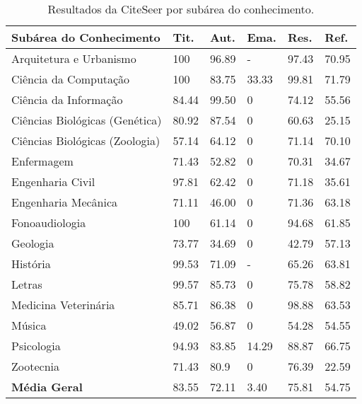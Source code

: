 \begin{table}
    \caption{Resultados da CiteSeer por subárea do conhecimento.}
    \begin{center}
        \begin{tabular}{|p{6cm}|C{1.2cm}|C{1.2cm}|C{1.2cm}|C{1.2cm}|C{1.2cm}|}
            \hline 
            \textbf{Subárea do Conhecimento} & \textbf{Tit.} & \textbf{Aut.} & \textbf{Ema.} & \textbf{Res.} & \textbf{Ref.} \\ \hline 
            Arquitetura e Urbanismo & 100 & 96.89 & - & 97.43 & 70.95 \\ \hline
            Ciência da Computação & 100 & 83.75 & 33.33 & 99.81 & 71.79 \\ \hline
            Ciência da Informação & 84.44 & 99.50 & 0 & 74.12 & 55.56 \\ \hline
            Ciências Biológicas (Genética) & 80.92 & 87.54 & 0 & 60.63 & 25.15 \\ \hline
            Ciências Biológicas (Zoologia) & 57.14 & 64.12 & 0 & 71.14 & 70.10 \\ \hline
            Enfermagem & 71.43 & 52.82 & 0 & 70.31 & 34.67 \\ \hline
            Engenharia Civil & 97.81 & 62.42 & 0 & 71.18 & 35.61 \\ \hline
            Engenharia Mecânica & 71.11 & 46.00 & 0 & 71.36 & 63.18 \\ \hline
            Fonoaudiologia & 100 & 61.14 & 0 & 94.68 & 61.85 \\ \hline
            Geologia & 73.77 & 34.69 & 0 & 42.79 & 57.13 \\ \hline
            História & 99.53 & 71.09 & - & 65.26 & 63.81 \\ \hline
            Letras & 99.57 & 85.73 & 0 & 75.78 & 58.82 \\ \hline
            Medicina Veterinária & 85.71 & 86.38 & 0 & 98.88 & 63.53 \\ \hline
            Música & 49.02 & 56.87 & 0 & 54.28 & 54.55 \\ \hline
            Psicologia & 94.93 & 83.85 & 14.29 & 88.87 & 66.75 \\ \hline
            Zootecnia & 71.43 & 80.9 & 0 & 76.39 & 22.59 \\ \hline
            \textbf{Média Geral} & 83.55 & 72.11 & 3.40 & 75.81 & 54.75 \\ \hline
        \end{tabular}
    \end{center}
    \label{tab:results-citeseer}
\end{table}

